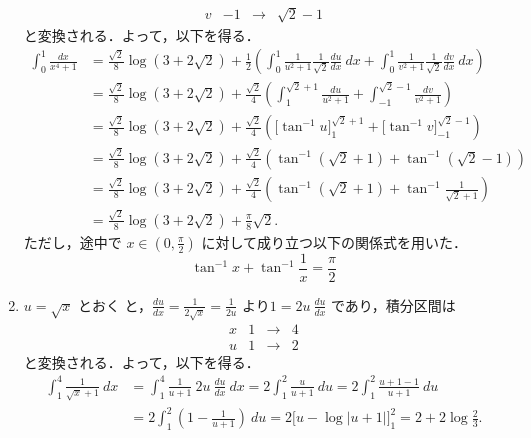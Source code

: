 \documentclass[11pt, uplatex, dvipdfmx]{jsarticle}
\begin{document}
\begin{enumerate}[(1)]
\[\begin{array}{c|ccc}
         v & -1 & \to & \sqrt{2}-1
       \end{array}
     \]
     と変換される．よって，以下を得る．     
     \[
       \begin{aligned}
         \int_{0}^{1} \frac{dx}{x^4+1} &= \frac{\sqrt{2}}{8} \log \left( 3+2\sqrt{2} \right)
         + \frac{1}{2} \left( \int_{0}^{1} \frac{1}{u^2+1} \frac{1}{\sqrt{2}} \frac{du}{dx} \ dx 
           + \int_{0}^{1} \frac{1}{v^2+1} \frac{1}{\sqrt{2}} \frac{dv}{dx} \ dx \right)\\
         &= \frac{\sqrt{2}}{8} \log \left(3+2\sqrt{2}\right) + \frac{\sqrt{2}}{4}
         \left( \int_{1}^{\sqrt{2}+1} \frac{du}{u^2+1} + \int_{-1}^{\sqrt{2}-1} \frac{dv}{v^2+1}\right)\\
         &= \frac{\sqrt{2}}{8} \log \left( 3 + 2\sqrt{2} \right) + \frac{\sqrt{2}}{4} \left(
           \Big[ \tan^{-1} u \Big]_{1}^{\sqrt{2}+1} + \Big[ \tan^{-1} v \Big]_{-1}^{\sqrt{2}-1}\right)\\
         &= \frac{\sqrt{2}}{8} \log \left( 3 +2 \sqrt{2} \right) + \frac{\sqrt{2}}{4} \left(
           \tan^{-1}\left( \sqrt{2}+1 \right) + \tan^{-1} \left( \sqrt{2}-1 \right) \right)\\
         &= \frac{\sqrt{2}}{8} \log \left( 3+2\sqrt{2} \right) + \frac{\sqrt{2}}{4} \left(
           \tan^{-1} \left(\sqrt{2}+1\right) + \tan^{-1} \frac{1}{\sqrt{2}+1} \right)\\
         &= \frac{\sqrt{2}}{8} \log \left(3+2\sqrt{2}\right) + \frac{\pi}{8}\sqrt{2}.
       \end{aligned}
     \]
     ただし，途中で $x \in \left(0,
       \frac{\pi}{2}\right)$ に対して成り立つ以下の関係式を用いた．
     \[
       \tan^{-1}x + \tan^{-1}\frac{1}{x} = \frac{\pi}{2}
     \]


   \item $u=\sqrt{x}$ とおく
     と，$\frac{du}{dx}=\frac{1}{2\sqrt{x}}=\frac{1}{2u}$
     より$1= 2u \ \frac{du}{dx}$ であり，積分区間は
     \[
       \begin{array}{c|ccc}
         x & 1 & \to & 4 \\ \hline
         u & 1 & \to & 2
       \end{array}
     \]
     と変換される．よって，以下を得る．
     \[
       \begin{aligned}
         \int_{1}^{4}\frac{1}{\sqrt{x}+1} \ dx &= \int_{1}^{4} \frac{1}{u+1} \ 2u \ \frac{du}{dx} \ dx
         = 2 \int_{1}^{2} \frac{u}{u+1} \ du = 2 \int_{1}^{2} \frac{u+1-1}{u+1} \ du\\
         &= 2 \int_{1}^{2} \left( 1 - \frac{1}{u+1} \right) \ du = 2 \Big[ u - \log|u+1| \Big]_{1}^{2}
         = 2 + 2 \log\frac{2}{3}.
       \end{aligned}
     \]


\end{enumerate}
\end{document}
